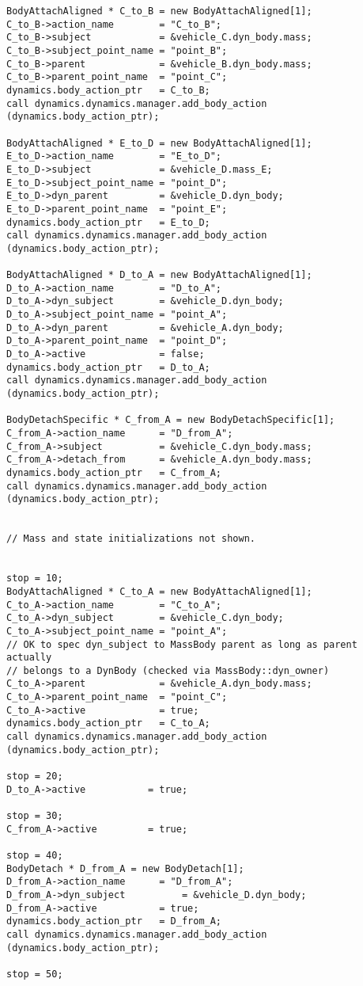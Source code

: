\begin{verbatim}
BodyAttachAligned * C_to_B = new BodyAttachAligned[1];
C_to_B->action_name        = "C_to_B";
C_to_B->subject            = &vehicle_C.dyn_body.mass;
C_to_B->subject_point_name = "point_B";
C_to_B->parent             = &vehicle_B.dyn_body.mass;
C_to_B->parent_point_name  = "point_C";
dynamics.body_action_ptr   = C_to_B;
call dynamics.dynamics.manager.add_body_action (dynamics.body_action_ptr);

BodyAttachAligned * E_to_D = new BodyAttachAligned[1];
E_to_D->action_name        = "E_to_D";
E_to_D->subject            = &vehicle_D.mass_E;
E_to_D->subject_point_name = "point_D";
E_to_D->dyn_parent         = &vehicle_D.dyn_body;
E_to_D->parent_point_name  = "point_E";
dynamics.body_action_ptr   = E_to_D;
call dynamics.dynamics.manager.add_body_action (dynamics.body_action_ptr);

BodyAttachAligned * D_to_A = new BodyAttachAligned[1];
D_to_A->action_name        = "D_to_A";
D_to_A->dyn_subject        = &vehicle_D.dyn_body;
D_to_A->subject_point_name = "point_A";
D_to_A->dyn_parent         = &vehicle_A.dyn_body;
D_to_A->parent_point_name  = "point_D";
D_to_A->active             = false;
dynamics.body_action_ptr   = D_to_A;
call dynamics.dynamics.manager.add_body_action (dynamics.body_action_ptr);

BodyDetachSpecific * C_from_A = new BodyDetachSpecific[1];
C_from_A->action_name      = "D_from_A";
C_from_A->subject          = &vehicle_C.dyn_body.mass;
C_from_A->detach_from      = &vehicle_A.dyn_body.mass;
dynamics.body_action_ptr   = C_from_A;
call dynamics.dynamics.manager.add_body_action (dynamics.body_action_ptr);


// Mass and state initializations not shown.


stop = 10;
BodyAttachAligned * C_to_A = new BodyAttachAligned[1];
C_to_A->action_name        = "C_to_A";
C_to_A->dyn_subject        = &vehicle_C.dyn_body;
C_to_A->subject_point_name = "point_A";
// OK to spec dyn_subject to MassBody parent as long as parent actually
// belongs to a DynBody (checked via MassBody::dyn_owner)
C_to_A->parent             = &vehicle_A.dyn_body.mass;
C_to_A->parent_point_name  = "point_C";
C_to_A->active             = true;
dynamics.body_action_ptr   = C_to_A;
call dynamics.dynamics.manager.add_body_action (dynamics.body_action_ptr);

stop = 20;
D_to_A->active           = true;

stop = 30;
C_from_A->active         = true;

stop = 40;
BodyDetach * D_from_A = new BodyDetach[1];
D_from_A->action_name      = "D_from_A";
D_from_A->dyn_subject          = &vehicle_D.dyn_body;
D_from_A->active           = true;
dynamics.body_action_ptr   = D_from_A;
call dynamics.dynamics.manager.add_body_action (dynamics.body_action_ptr);

stop = 50;
\end{verbatim}

